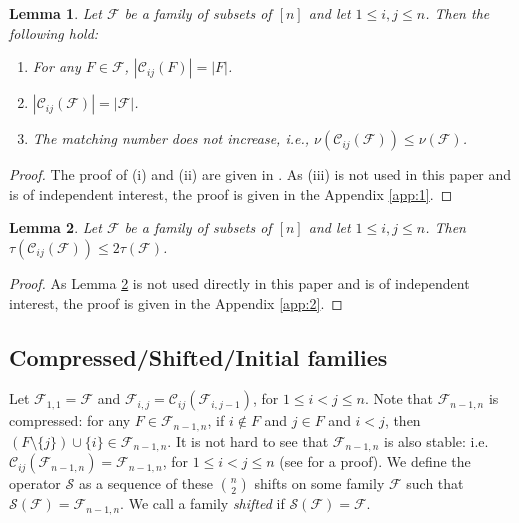 \documentclass[runningheads,12pt,a4paper]{article}
\newtheorem{lemma}{Lemma}
\begin{document}
	\begin{lemma} \label{lemma:1}
		Let $\mathcal{F}$ be a family of subsets of $[n]$ and let $1 \leq i, j \leq n$. Then the following hold:
		\begin{enumerate}[label=(\roman*)]
			\item For any $F \in \mathcal{F}$, $|\mathcal{C}_{ij}(F)| = |F|$.
			\item $|\mathcal{C}_{ij}(\mathcal{F})| = |\mathcal{F}|$.
			\item The matching number does not increase, i.e., $\nu(\mathcal{C}_{ij}(\mathcal{F})) \leq \nu(\mathcal{F})$.
		\end{enumerate}
	\end{lemma}
	
	\begin{proof}
		The proof of (i) and (ii) are given in \cite{frankl1987}. As (iii) is not used in this paper and is of independent interest, the proof is given in the Appendix \ref{app:1}. 
	\end{proof}
	\begin{lemma} \label{lemma:2}
		Let $\mathcal{F}$ be a family of subsets of $[n]$ and let $1 \leq i, j \leq n$. Then  $\tau(\mathcal{C}_{ij}(\mathcal{F})) \leq 2\tau(\mathcal{F})$.
	\end{lemma}
	
	\begin{proof}
		As Lemma \ref{lemma:2} is not used directly in this paper and is of independent interest, the proof is given in the Appendix \ref{app:2}. 
	\end{proof}
	
	
	\subsection*{Compressed/Shifted/Initial families}	
	
	Let $\mathcal{F}_{1,1}=\mathcal{F}$ and $\mathcal{F}_{i,j}=\mathcal{C}_{ij}(\mathcal{F}_{i,j-1})$, for $1 \leq i< j \leq n$.  Note that $\mathcal{F}_{n-1,n}$ is compressed: for any $F \in \mathcal{F}_{n-1,n}$, if $i \notin F$ and $j \in F$ and $i<j$, then $(F \setminus \{j\}) \cup \{i\} \in \mathcal{F}_{n-1,n}$. It is not hard to see that $\mathcal{F}_{n-1,n}$ is also stable: i.e. $\mathcal{C}_{ij}(\mathcal{F}_{n-1,n})=\mathcal{F}_{n-1,n}$, for $1 \leq i< j \leq n$ (see \cite{frankl1987} for a proof). We define the operator $\mathcal S$ as a sequence of these $\binom{n}{2}$ shifts on some family  $\mathcal{F}$ such that $\mathcal{S}(\mathcal{F})=\mathcal{F}_{n-1,n}$.
	We call a family \emph{shifted} if  $\mathcal{S}(\mathcal{F})=\mathcal{F}$.
	
\end{document}
